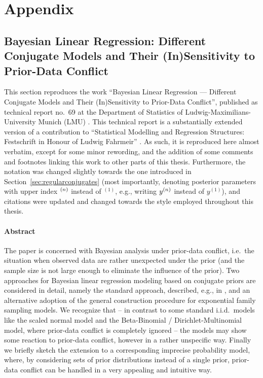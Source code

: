 \chapter{Appendix}
\label{cha:appendix}


\section{Bayesian Linear Regression: Different Conjugate Models and Their (In)Sensi\-ti\-vi\-ty to Prior-Data Conflict}
\label{sec:festschrift}

This section reproduces the work
``Bayesian Linear Regression --- Different Conjugate Models and Their (In)Sensitivity to Prior-Data Conflict'',
published as technical report no.~69 at the Department of Statistics of Ludwig-Maximilians-University Munich (LMU)
\parencite{Walter2009b}. This technical report is a substantially extended version of a contribution to
``Statistical Modelling and Regression Structures: Festschrift in Honour of Ludwig Fahrmeir'' \parencite{Walter2010a}.
As such, it is reproduced here almost verbatim, except for some minor rewording,
and the addition of some comments and footnotes linking this work to other parts of this thesis.
Furthermore, the notation was changed slightly towards the one introduced in Section~\ref{sec:regularconjugates}
(most importantly, denoting posterior parameters with upper index ${}^{(n)}$ instead of ${}^{(1)}$,
e.g., writing $y^{(n)}$ instead of $y^{(1)}$),
and citations were updated and changed towards the style employed throughout this thesis.

\subsubsection*{Abstract}

The paper is concerned with Bayesian analysis under
prior-data conflict, i.e.\ the situation when observed data are
rather unexpected under the prior (and the sample size is not large
enough to eliminate the influence of the prior). Two approaches for
Bayesian linear regression modeling based on conjugate priors are
considered in detail, namely the standard approach, described, e.g., in
\textcite{2013:fahrmeier-kneib-lang-marx}, and an alternative adoption of the
general construction procedure for exponential family sampling
models. We recognize that -- in contrast to some standard i.i.d.\
models like the scaled normal model and the Beta-Binomial /
Dirichlet-Multinomial model, where prior-data conflict is completely
ignored -- the models may show some reaction to prior-data conflict,
however in a rather unspecific way. Finally we briefly sketch the
extension to a corresponding imprecise probability model, where,
by considering sets of prior distributions instead of a single prior,
prior-data conflict can be handled in a very appealing and intuitive way.


